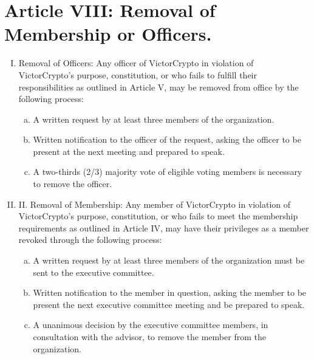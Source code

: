 \documentclass[11pt]{article}
\begin{document}
    \section{Article VIII: Removal of Membership or Officers.}

    \begin{enumerate}[I.]
        \item Removal of Officers: Any officer of VictorCrypto in violation of VictorCrypto's purpose, constitution, or who
        fails to fulfill their responsibilities as outlined in Article V, may be removed from office by the following process:
        \begin{enumerate}[a.]
            \item A written request by at least three members of the organization.
            \item Written notification to the officer of the request, asking the officer to be present at the next meeting and prepared to speak.
            \item A two-thirds (2/3) majority vote of eligible voting members is necessary to remove the officer.
        \end{enumerate}
        \item II. Removal of Membership: Any member of VictorCrypto in violation of VictorCrypto's purpose, constitution, or
        who fails to meet the membership requirements as outlined in Article IV, may have their privileges as a member revoked through the following process:
        \begin{enumerate}[a.]
            \item A written request by at least three members of the organization must be sent to the executive
            committee.
            \item Written notification to the member in question, asking the member to be present the next executive
            committee meeting and be prepared to speak.
            \item A unanimous decision by the executive committee members, in consultation with the advisor, to remove
            the member from the organization.
        \end{enumerate}
    \end{enumerate}
\end{document}
